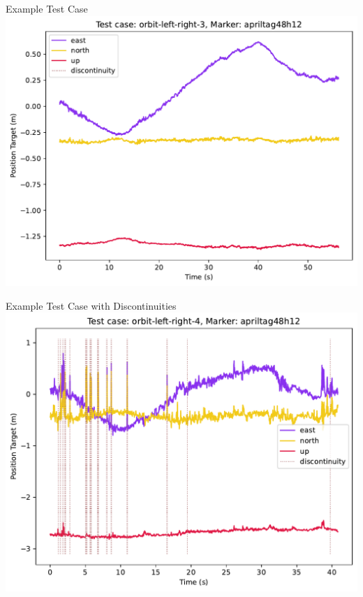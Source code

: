 \documentclass[aspectratio=169]{beamer}
\begin{document}
\begin{frame}{Example Test Case}
	\centering
	\includegraphics[width=0.75\linewidth]{images/orbit-left-right-3_apriltag48h12_position-target}
\end{frame}

\begin{frame}{Example Test Case with Discontinuities}
	\centering
	\includegraphics[width=0.75\linewidth]{images/orbit-left-right-4_apriltag48h12_position-target}
\end{frame}
\end{document}
